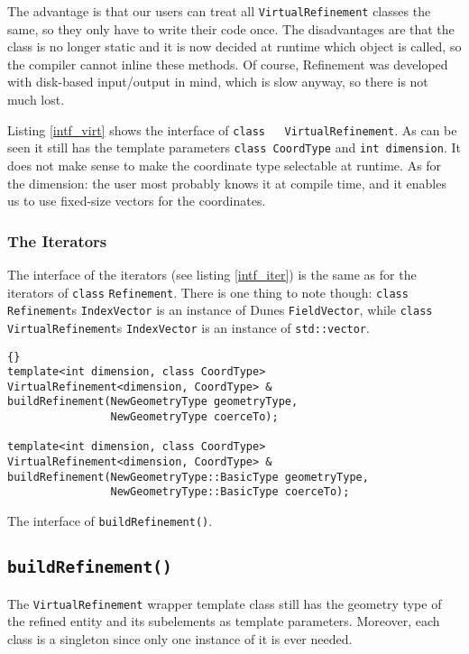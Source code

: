 \documentclass[english,a4paper]{article}
\newcommand{\code}[1]{\textnormal{\lstinline{#1}}}
\begin{document}
The advantage is that our users can treat all \code{VirtualRefinement}
classes the same, so they only have to write their code once.  The
disadvantages are that the class is no longer static and it is now
decided at runtime which object is called, so the compiler cannot
inline these methods.  Of course, Refinement was developed with
disk-based input/output in mind, which is slow anyway, so there is not
much lost.

Listing \ref{intf_virt} shows the interface of \code{class
  VirtualRefinement}.  As can be seen it still has the template
parameters \code{class CoordType} and \code{int dimension}.  It does
not make sense to make the coordinate type selectable at runtime.  As
for the dimension: the user most probably knows it at compile time,
and it enables us to use fixed-size vectors for the coordinates.

\subsubsection{The Iterators}

The interface of the iterators (see listing \ref{intf_iter}) is the
same as for the iterators of \code{class} \code{Refinement}.  There is
one thing to note though: \code{class Refinement}s \code{IndexVector}
is an instance of Dunes \code{FieldVector}, while \code{class
  VirtualRefinement}s \code{IndexVector} is an instance of
\code{std::vector}.

\begin{Listing}
  \begin{lstlisting}{}
template<int dimension, class CoordType>
VirtualRefinement<dimension, CoordType> &
buildRefinement(NewGeometryType geometryType,
                NewGeometryType coerceTo);

template<int dimension, class CoordType>
VirtualRefinement<dimension, CoordType> &
buildRefinement(NewGeometryType::BasicType geometryType,
                NewGeometryType::BasicType coerceTo);
  \end{lstlisting}
  \caption{The interface of \code{buildRefinement()}.}
  \label{buildref}
\end{Listing}

\subsection{\code{buildRefinement()}}

The \code{VirtualRefinement} wrapper template class still has the
geometry type of the refined entity and its subelements as template
parameters.  Moreover, each class is a singleton since only one
instance of it is ever needed.
\end{document}
